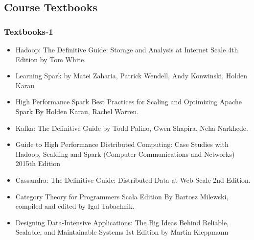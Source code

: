 \subsection{Course Textbooks}
\begin{frame}
\frametitle{Textbooks-1}
	\begin{itemize}
		\item<1-> Hadoop: The Definitive Guide: Storage and Analysis at Internet Scale 4th Edition by Tom White.
		\item<2-> Learning Spark by Matei Zaharia, Patrick Wendell, Andy Konwinski, Holden Karau
		\item<3-> High Performance Spark Best Practices for Scaling and Optimizing Apache Spark By Holden Karau, Rachel Warren.
		\item<4-> Kafka: The Definitive Guide by Todd Palino, Gwen Shapira, Neha Narkhede.
		\item<5-> Guide to High Performance Distributed Computing: Case Studies with Hadoop, Scalding and Spark (Computer Communications and Networks) 2015th Edition			
		\item<6-> Cassandra: The Definitive Guide: Distributed Data at Web Scale 2nd Edition.
		\item<7-> Category Theory for Programmers Scala Edition By Bartosz Milewski, compiled and edited by	Igal Tabachnik.
		\item<8-> Designing Data-Intensive Applications: The Big Ideas Behind Reliable, Scalable, and Maintainable Systems 1st Edition by Martin Kleppmann			
		
	\end{itemize}
\end{frame}


